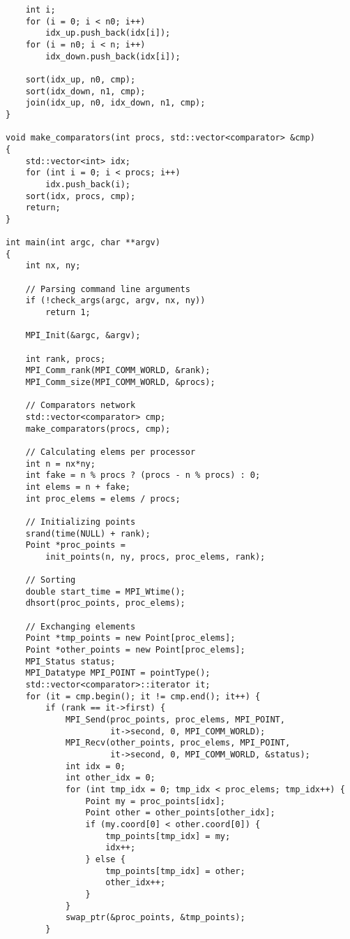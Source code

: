 \documentclass[oneside,final,14pt]{extreport}
\begin{document}
\begin{verbatim}
    int i;
    for (i = 0; i < n0; i++)
        idx_up.push_back(idx[i]);
    for (i = n0; i < n; i++)
        idx_down.push_back(idx[i]);

    sort(idx_up, n0, cmp);
    sort(idx_down, n1, cmp);
    join(idx_up, n0, idx_down, n1, cmp);
}

void make_comparators(int procs, std::vector<comparator> &cmp)
{
    std::vector<int> idx;
    for (int i = 0; i < procs; i++)
        idx.push_back(i);
    sort(idx, procs, cmp);
    return;
}

int main(int argc, char **argv)
{
    int nx, ny;

    // Parsing command line arguments
    if (!check_args(argc, argv, nx, ny))
        return 1;

    MPI_Init(&argc, &argv);

    int rank, procs;
    MPI_Comm_rank(MPI_COMM_WORLD, &rank);
    MPI_Comm_size(MPI_COMM_WORLD, &procs);

    // Comparators network
    std::vector<comparator> cmp;
    make_comparators(procs, cmp);

    // Calculating elems per processor
    int n = nx*ny;
    int fake = n % procs ? (procs - n % procs) : 0;
    int elems = n + fake;
    int proc_elems = elems / procs;

    // Initializing points
    srand(time(NULL) + rank);
    Point *proc_points =
        init_points(n, ny, procs, proc_elems, rank);

    // Sorting
    double start_time = MPI_Wtime();
    dhsort(proc_points, proc_elems);

    // Exchanging elements
    Point *tmp_points = new Point[proc_elems];
    Point *other_points = new Point[proc_elems];
    MPI_Status status;
    MPI_Datatype MPI_POINT = pointType();
    std::vector<comparator>::iterator it;
    for (it = cmp.begin(); it != cmp.end(); it++) {
        if (rank == it->first) {
            MPI_Send(proc_points, proc_elems, MPI_POINT,
                     it->second, 0, MPI_COMM_WORLD);
            MPI_Recv(other_points, proc_elems, MPI_POINT,
                     it->second, 0, MPI_COMM_WORLD, &status);
            int idx = 0;
            int other_idx = 0;
            for (int tmp_idx = 0; tmp_idx < proc_elems; tmp_idx++) {
                Point my = proc_points[idx];
                Point other = other_points[other_idx];
                if (my.coord[0] < other.coord[0]) {
                    tmp_points[tmp_idx] = my;
                    idx++;
                } else {
                    tmp_points[tmp_idx] = other;
                    other_idx++;
                }
            }
            swap_ptr(&proc_points, &tmp_points);
        }


\end{verbatim}
\end{document}
